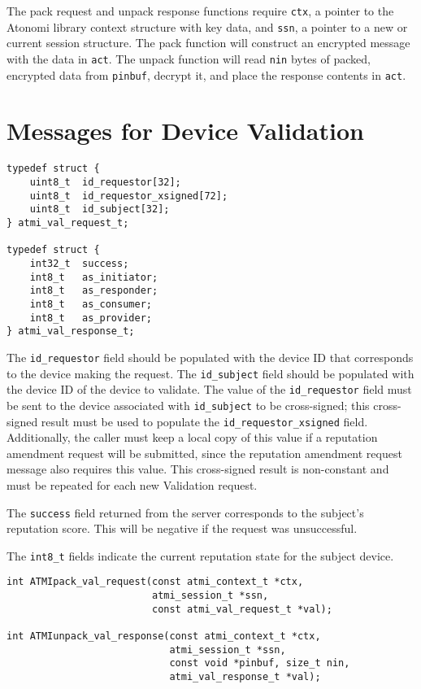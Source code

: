 The pack request and unpack response functions require \texttt{ctx}, a pointer
to the Atonomi library context structure with key data, and \texttt{ssn},
a pointer to a new or current session structure. The pack function will
construct an encrypted message with the data in \texttt{act}. The unpack function
will read \texttt{nin} bytes of packed, encrypted data from \texttt{pinbuf},
decrypt it, and place the response contents in \texttt{act}.



\section{Messages for Device Validation}
\label{s:api_validation}
\begin{lstlisting}[name=Validation Request and Response Structures]
typedef struct {
	uint8_t  id_requestor[32];
	uint8_t  id_requestor_xsigned[72];
	uint8_t  id_subject[32];
} atmi_val_request_t;

typedef struct {
	int32_t  success;
	int8_t   as_initiator;
	int8_t   as_responder;
	int8_t   as_consumer;
	int8_t   as_provider;
} atmi_val_response_t;
\end{lstlisting}

The \texttt{id_requestor} field should be populated with the device ID that
corresponds to the device making the request. The \texttt{id_subject} field
should be populated with the device ID of the device to validate. The value
of the \texttt{id_requestor} field must be sent to the device associated with
\texttt{id_subject} to be cross-signed; this cross-signed result must be used
to populate the \texttt{id_requestor_xsigned} field. Additionally, the caller
must keep a local copy of this value if a reputation amendment request will be
submitted, since the reputation amendment request message also requires this
value. This cross-signed result is non-constant and must be repeated for
each new Validation request.

The \texttt{success} field returned from the server corresponds to the
subject's reputation score. This will be negative if the request was unsuccessful.

The \texttt{int8_t} fields indicate the current reputation state for the
subject device.

\pagebreak
\begin{lstlisting}[name=Validation Request Packing and Response Unpacking Functions]
int ATMIpack_val_request(const atmi_context_t *ctx,
                         atmi_session_t *ssn,
                         const atmi_val_request_t *val);

int ATMIunpack_val_response(const atmi_context_t *ctx,
                            atmi_session_t *ssn,
                            const void *pinbuf, size_t nin,
                            atmi_val_response_t *val);
\end{lstlisting}

